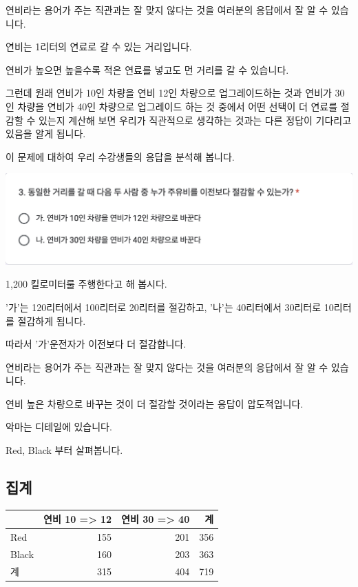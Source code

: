 \documentclass[
]{book}
\begin{document}
연비라는 용어가 주는 직관과는 잘 맞지 않다는 것을 여러분의 응답에서 잘 알 수 있습니다.

연비는 1리터의 연료로 갈 수 있는 거리입니다.

연비가 높으면 높을수록 적은 연료를 넣고도 먼 거리를 갈 수 있습니다.

그런데 원래 연비가 10인 차량을 연비 12인 차량으로 업그레이드하는 것과 연비가 30인 차량을 연비가 40인 차량으로 업그레이드 하는 것 중에서 어떤 선택이 더 연료를 절감할 수 있는지 계산해 보면 우리가 직관적으로 생각하는 것과는 다른 정답이 기다리고 있음을 알게 됩니다.

이 문제에 대하여 우리 수강생들의 응답을 분석해 봅니다.

\includegraphics[width=0.75\linewidth]{./pics/Quiz240524_Q3}

1,200 킬로미터룰 주행한다고 해 봅시다.

'가'는 120리터에서 100리터로 20리터를 절감하고, '나'는 40리터에서 30리터로 10리터를 절감하게 됩니다.

따라서 '가'운전자가 이전보다 더 절감합니다.

연비라는 용어가 주는 직관과는 잘 맞지 않다는 것을 여러분의 응답에서 잘 알 수 있습니다.

연비 높은 차량으로 바꾸는 것이 더 절감할 것이라는 응답이 압도적입니다.

악마는 디테일에 있습니다.

Red, Black 부터 살펴봅니다.

\subsection{집계}\label{uxc9d1uxacc4-60}

\begin{tabular}{l|r|r|r}
\hline
  & 연비 10 => 12 & 연비 30 => 40 & 계\\
\hline
Red & 155 & 201 & 356\\
\hline
Black & 160 & 203 & 363\\
\hline
계 & 315 & 404 & 719\\
\hline
\end{tabular}
\end{document}

